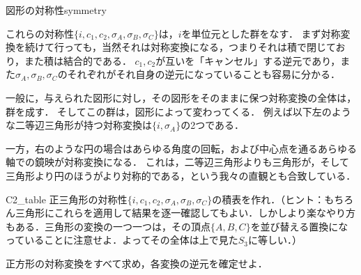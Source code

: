 \documentclass[11pt,a4paper]{jsarticle}
\begin{document}
\begin{rei}{図形の対称性}{symmetry}
\begin{center}
    \end{center}
    
    これらの対称性$\{i, c_1, c_2, \sigma_A, \sigma_B, \sigma_C\}$は，$i$を単位元とした群をなす．
    まず対称変換を続けて行っても，当然それは対称変換になる，つまりそれは積で閉じており，また積は結合的である．
    $c_1, c_2$が互いを「キャンセル」する逆元であり，また$\sigma_A, \sigma_B, \sigma_C$のそれぞれがそれ自身の逆元になっていることも容易に分かる．
    
    一般に，与えられた図形に対し，その図形をそのままに保つ対称変換の全体は，群を成す．
    そしてこの群は，図形によって変わってくる．
    例えば以下左のような二等辺三角形が持つ対称変換は$\{i, \sigma_A\}$の2つである．
    \begin{center}
    \end{center}
    一方，右のような円の場合はあらゆる角度の回転，および中心点を通るあらゆる軸での鏡映が対称変換になる．
    これは，二等辺三角形よりも三角形が，そして三角形より円のほうがより対称的である，という我々の直観とも合致している．

\end{rei}

\begin{renshu}{}{C2_table}
    正三角形の対称性$\{i, c_1, c_2, \sigma_A, \sigma_B, \sigma_C\}$の積表を作れ．（ヒント：もちろん三角形にこれらを適用して結果を逐一確認してもよい．しかしより楽なやり方もある．三角形の変換の一つ一つは，その頂点$\{A, B, C\}$を並び替える置換になっていることに注意せよ．よってその全体は上で見た$S_3$に等しい．）
\end{renshu}
 
\begin{renshu}{}{}
    正方形の対称変換をすべて求め，各変換の逆元を確定せよ．
\end{renshu}
\end{document}
